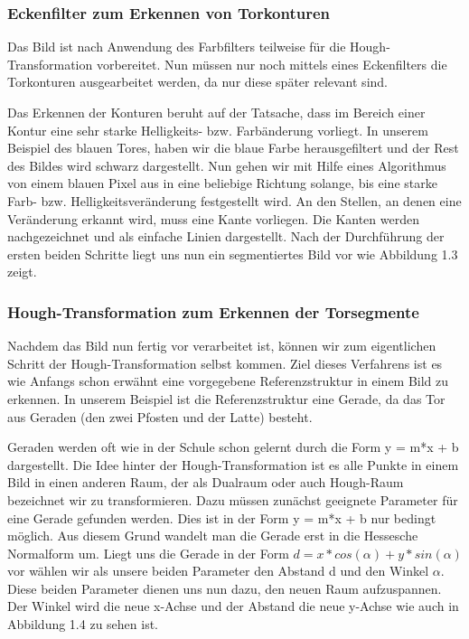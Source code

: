 \documentclass[a4paper,12pt]{article}
\begin{document}
\subsubsection{Eckenfilter zum Erkennen von Torkonturen} 
Das Bild ist nach Anwendung des Farbfilters teilweise für die Hough-Transformation vorbereitet. Nun müssen nur noch mittels eines Eckenfilters die Torkonturen ausgearbeitet werden, da nur diese später relevant sind.

Das Erkennen der Konturen beruht auf der Tatsache, dass im Bereich einer Kontur eine sehr starke Helligkeits- bzw. Farbänderung vorliegt. In unserem Beispiel des blauen Tores, haben wir die blaue Farbe herausgefiltert und der Rest des Bildes wird schwarz dargestellt. Nun gehen wir mit Hilfe eines Algorithmus von einem blauen Pixel aus in eine beliebige Richtung solange, bis eine starke Farb- bzw. Helligkeitsveränderung festgestellt wird. An den Stellen, an denen eine Veränderung erkannt wird, muss eine Kante vorliegen. Die Kanten werden nachgezeichnet und als einfache Linien dargestellt. Nach der Durchführung der ersten beiden Schritte liegt uns nun ein segmentiertes Bild vor wie Abbildung 1.3 zeigt.

\subsubsection{Hough-Transformation zum Erkennen der Torsegmente}
Nachdem das Bild nun fertig vor verarbeitet ist, können wir zum eigentlichen Schritt der Hough-Transformation selbst kommen. Ziel dieses Verfahrens ist es wie Anfangs schon erwähnt eine vorgegebene Referenzstruktur in einem Bild zu erkennen. In unserem Beispiel ist die Referenzstruktur eine Gerade, da das Tor aus Geraden (den zwei Pfosten und der Latte) besteht.

Geraden werden oft wie in der Schule schon gelernt durch die Form 
y = m*x + b dargestellt. Die Idee hinter der Hough-Transformation ist es alle Punkte in einem Bild in einen anderen Raum, der als Dualraum oder auch Hough-Raum bezeichnet wir zu transformieren. Dazu müssen zunächst geeignete Parameter für eine Gerade gefunden werden. Dies ist in der Form
y = m*x + b nur bedingt möglich. Aus diesem Grund wandelt man die Gerade erst in die Hessesche Normalform um. Liegt uns die Gerade in der Form 
\(d = x*cos(\alpha) + y*sin(\alpha)\) vor wählen wir als unsere beiden Parameter den Abstand d und den Winkel \(\alpha\). Diese beiden Parameter dienen uns nun dazu, den neuen Raum aufzuspannen. Der Winkel wird die neue x-Achse und der Abstand die neue y-Achse wie auch in Abbildung 1.4 zu sehen ist.
\end{document}
